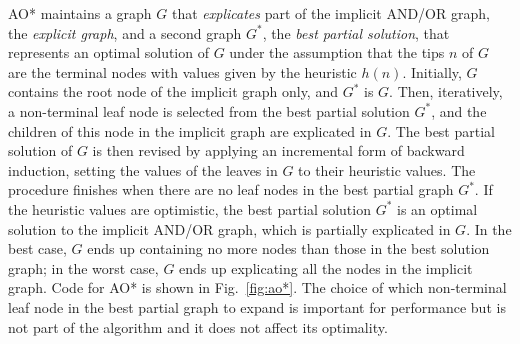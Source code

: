 \documentclass[letterpaper]{article}
\begin{document}
AO* maintains a graph $G$ that \emph{explicates} part of the implicit AND/OR
graph, the \emph{explicit graph}, and a second graph $G^*$, the \emph{best 
partial solution},  that represents an optimal solution of $G$
under the assumption that the tips $n$ of $G$ are the terminal nodes 
with values given by the heuristic $h(n)$.
Initially, $G$ contains the root node of the implicit graph only, and 
$G^*$ is  $G$. Then, iteratively, a non-terminal leaf node is selected
from the best partial solution $G^*$,  and the children of this node in 
the implicit graph are explicated in $G$. The best partial solution  of $G$ 
is then revised by applying an incremental form of  backward induction, 
setting the values of the leaves in $G$ to their heuristic values.
The procedure finishes when there are no leaf nodes in the best partial graph $G^*$. 
If the heuristic values are optimistic, the best partial solution $G^*$ is an 
optimal solution to the implicit AND/OR graph, which is partially explicated in $G$.
In the best case, $G$  ends up containing no more nodes than those in the
best solution graph; in the worst case, $G$  ends up explicating all the
nodes in the implicit graph. Code for AO* is shown in Fig.~\ref{fig:ao*}. 
The choice of which non-terminal leaf node in the best partial graph to expand is 
important for performance  but is not part of the algorithm and it 
does not affect its optimality.
\end{document}
